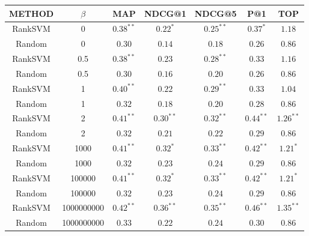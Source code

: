 \begin{tabular}{|c|c|c|c|c|c|c|}
\hline
METHOD & $ \beta $ & MAP & NDCG@1 & NDCG@5 & P@1 & TOP\\ 
\hline
RankSVM & 0 & $0.38^{**}$ & $0.22^*$ & $0.25^{**}$ & $0.37^*$ & $1.18$\\ 
\hline
Random & 0 & $0.30$ & $0.14$ & $0.18$ & $0.26$ & $0.86$\\ 
\hline
RankSVM & 0.5 & $0.38^{**}$ & $0.23$ & $0.28^{**}$ & $0.33$ & $1.16$\\ 
\hline
Random & 0.5 & $0.30$ & $0.16$ & $0.20$ & $0.26$ & $0.86$\\ 
\hline
RankSVM & 1 & $0.40^{**}$ & $0.22$ & $0.29^{**}$ & $0.33$ & $1.04$\\ 
\hline
Random & 1 & $0.32$ & $0.18$ & $0.20$ & $0.28$ & $0.86$\\ 
\hline
RankSVM & 2 & $0.41^{**}$ & $0.30^{**}$ & $0.32^{**}$ & $0.44^{**}$ & $1.26^{**}$\\ 
\hline
Random & 2 & $0.32$ & $0.21$ & $0.22$ & $0.29$ & $0.86$\\ 
\hline
RankSVM & 1000 & $0.41^{**}$ & $0.32^*$ & $0.33^{**}$ & $0.42^{**}$ & $1.21^*$\\ 
\hline
Random & 1000 & $0.32$ & $0.23$ & $0.24$ & $0.29$ & $0.86$\\ 
\hline
RankSVM & 100000 & $0.41^{**}$ & $0.32^*$ & $0.33^{**}$ & $0.42^{**}$ & $1.21^*$\\ 
\hline
Random & 100000 & $0.32$ & $0.23$ & $0.24$ & $0.29$ & $0.86$\\ 
\hline
RankSVM & 1000000000 & $0.42^{**}$ & $0.36^{**}$ & $0.35^{**}$ & $0.46^{**}$ & $1.35^{**}$\\ 
\hline
Random & 1000000000 & $0.33$ & $0.22$ & $0.24$ & $0.30$ & $0.86$\\ 
\hline
\end{tabular}
